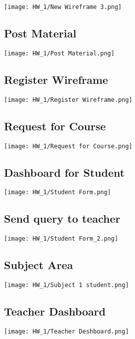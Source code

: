\texttt{[image: HW\_1/New Wireframe 3.png]}

\subsection{Post Material}

\texttt{[image: HW\_1/Post Material.png]}

\subsection{Register Wireframe}

\texttt{[image: HW\_1/Register Wireframe.png]}

\subsection{Request for Course}

\texttt{[image: HW\_1/Request for Course.png]}

\subsection{Dashboard for Student}

\texttt{[image: HW\_1/Student Form.png]}

\subsection{Send query to teacher}

\texttt{[image: HW\_1/Student Form\_2.png]}

\subsection{Subject Area}

\texttt{[image: HW\_1/Subject 1 student.png]}

\subsection{Teacher Dashboard}

\texttt{[image: HW\_1/Teacher Deshboard.png]}

